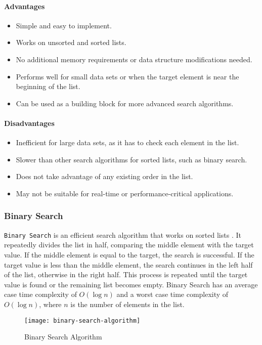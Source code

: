 \paragraph{Advantages}
\begin{itemize}
    \item Simple and easy to implement.
    \item Works on unsorted and sorted lists.
    \item No additional memory requirements or data structure modifications needed.
    \item Performs well for small data sets or when the target element is near the beginning of the list.
    \item Can be used as a building block for more advanced search algorithms.
\end{itemize}
\paragraph{Disadvantages}
\begin{itemize}
    \item Inefficient for large data sets, as it has to check each element in the list.
    \item Slower than other search algorithms for sorted lists, such as binary search.
    \item Does not take advantage of any existing order in the list.
    \item May not be suitable for real-time or performance-critical applications.
\end{itemize}

\subsubsection{Binary Search}
\lstinline{Binary Search} is an efficient search algorithm that works on sorted lists \cite{popovi_binary_search}. It repeatedly divides the list in half, comparing the middle element with the target value. If the middle element is equal to the target, the search is successful. If the target value is less than the middle element, the search continues in the left half of the list, otherwise in the right half. This process is repeated until the target value is found or the remaining list becomes empty. Binary Search has an average case time complexity of $O(\log n)$ and a worst case time complexity of $O(\log n)$, where $n$ is the number of elements in the list.

\begin{figure}[htbp]
    \centering
    \texttt{[image: binary-search-algorithm]}
    \caption{Binary Search Algorithm \cite{jamie_binary_search}}
    \label{fig:binary-search-algorithm}
\end{figure}

